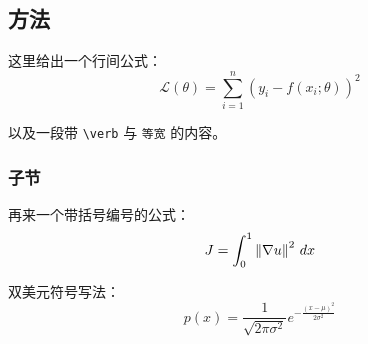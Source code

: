 \subsection{方法}

这里给出一个行间公式：
\[
  \mathcal{L}(\theta) = \sum_{i=1}^{n} \left( y_i - f(x_i;\theta) \right)^2
\]

以及一段带 \verb|\verb| 与 \texttt{等宽} 的内容。

\subsubsection{子节}
再来一个带括号编号的公式：
\begin{equation}
  J = \int_{0}^{1} \left\lVert \nabla u \right\rVert^2 \, dx
\end{equation}

双美元符号写法：
$$ p(x) = \frac{1}{\sqrt{2\pi\sigma^2}} e^{-\frac{(x-\mu)^2}{2\sigma^2}} $$
